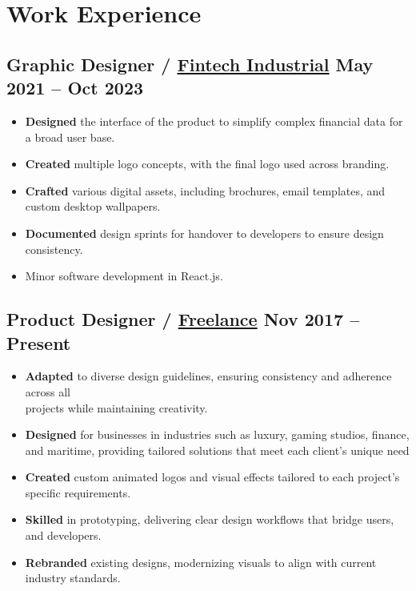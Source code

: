 \section*{Work Experience}
%
%
%
\subsection*{
  Graphic Designer / \href{https://www.linkedin.com/company/fintech-industrial/}{Fintech Industrial}
  \hspace*{\fill}
  \dateformat May 2021 -- Oct 2023
}
\begin{itemize}
  \item \textbf{Designed} the interface of the product to simplify complex financial data for a broad user base.
  \item \textbf{Created} multiple logo concepts, with the final logo used across branding.
  \item \textbf{Crafted} various digital assets, including brochures, email templates, and custom desktop wallpapers.
  \item \textbf{Documented} design sprints for handover to developers to ensure design consistency.
  \item Minor software development in React.js.
\end{itemize}
%
%
\subsection*{
  Product Designer / \href{https://bumbleboss.xyz/}{Freelance}
  \hspace*{\fill}
  \dateformat Nov 2017 -- Present
}
\begin{itemize}
  \item \textbf{Adapted} to diverse design guidelines, ensuring consistency and adherence across all\\projects while maintaining creativity.
  \item \textbf{Designed} for businesses in industries such as luxury, gaming studios, finance, and maritime, providing tailored solutions that meet each client's unique need
  \item \textbf{Created} custom animated logos and visual effects tailored to each project's specific requirements.
  \item \textbf{Skilled} in prototyping, delivering clear design workflows that bridge users, and developers.
  \item \textbf{Rebranded} existing designs, modernizing visuals to align with current industry standards.
\end{itemize}
%
%
